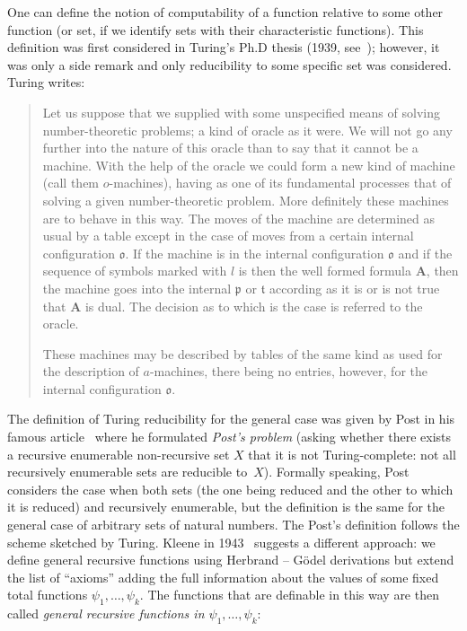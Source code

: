 \documentclass[12pt]{article}
\theoremstyle{remark}
\begin{document}
One can define the notion of computability of a function relative to some other function (or set, if we identify sets with their characteristic functions). This definition was first considered in Turing's Ph.D thesis (1939, see~\cite{Turing1939}); however, it was only a side remark and only reducibility to some specific set was considered. Turing writes:
\begin{quote}
Let us suppose that we supplied with some unspecified means of solving number-theoretic problems; a kind of oracle as it were. We will not go any further into the nature of this oracle than to say that it cannot be a machine.  With the help of the oracle we could form a new kind of machine (call them $o$-machines), having as one of its fundamental processes that of solving a given number-theoretic problem. More definitely these machines are to behave in this way. The moves of the machine are determined as usual by a table except in the case of moves from a certain internal configuration $\mathfrak{o}$. If the machine is in the internal configuration $\mathfrak{o}$ and if the sequence of symbols marked with $l$ is then the well formed formula \textbf{A}, then the machine goes into the internal $\mathfrak{p}$ or $\mathfrak{t}$ according as it is or is not true that \textbf{A} is dual. The decision as to which is the case is referred to the oracle.\par These machines may be described by tables of the same kind as used for the description of $a$-machines, there being no entries, however, for the internal configuration $\mathfrak{o}$.
\end{quote}
The definition of Turing reducibility for the general case was given by Post in his famous article~\cite[Section 11]{Post1944} where he formulated \emph{Post's problem} (asking whether there exists a recursive enumerable non-recursive set $X$ that it is not Turing-complete: not all recursively enumerable sets are reducible to~$X$). Formally speaking, Post considers the case when both sets (the one being reduced and the other to which it is reduced) and recursively enumerable, but the definition is the same for the general case of arbitrary sets of natural numbers. The Post's definition follows the scheme sketched by Turing. Kleene in 1943~\cite{Kleene1943} suggests a different approach: we define general recursive functions using Herbrand -- G\"{o}del derivations but extend the list of ``axioms'' adding the full information about the values of some fixed total functions $\psi_1,\ldots,\psi_k$. The functions that are definable in this way are then called \emph{general recursive functions in $\psi_1,\ldots,\psi_k$}:
\end{document}
